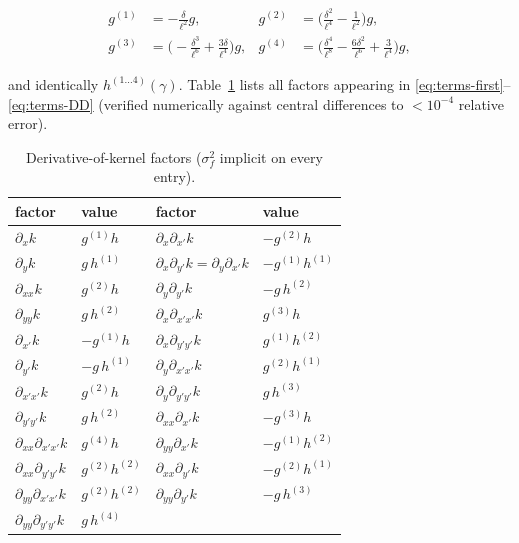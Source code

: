 \documentclass[11pt]{article}
\begin{document}
\begin{equation}
  \label{eq:gderivs}
  \begin{aligned}
  g^{(1)}&=-\tfrac{\delta}{\ell^{2}}g, &
  g^{(2)}&=\bigl(\tfrac{\delta^{2}}{\ell^{4}}-\tfrac{1}{\ell^{2}}\bigr)g, \\
  g^{(3)}&=\bigl(-\tfrac{\delta^{3}}{\ell^{6}}+\tfrac{3\delta}{\ell^{4}}\bigr)g, &
  g^{(4)}&=\bigl(\tfrac{\delta^{4}}{\ell^{8}}-\tfrac{6\delta^{2}}{\ell^{6}}+\tfrac{3}{\ell^{4}}\bigr)g,
  \end{aligned}
\end{equation}

and identically $h^{(1\ldots4)}(\gamma)$. Table~\ref{tab:factors} lists all factors
appearing in \eqref{eq:terms-first}--\eqref{eq:terms-DD} (verified numerically
against central differences to $<10^{-4}$ relative error).

\begin{table}[h]
  \centering
  \caption{Derivative-of-kernel factors ($\sigma_f^{2}$ implicit on every entry).}
  \label{tab:factors}
  \begin{tabular}{@{}llll@{}}
    \toprule
    factor & value & factor & value \\
    \midrule
    $\partial_x k$ & $g^{(1)}h$ &
    $\partial_x\partial_{x'}k$ & $-g^{(2)}h$ \\
    $\partial_y k$ & $g\,h^{(1)}$ &
    $\partial_x\partial_{y'}k=\partial_y\partial_{x'}k$ & $-g^{(1)}h^{(1)}$ \\
    $\partial_{xx}k$ & $g^{(2)}h$ &
    $\partial_y\partial_{y'}k$ & $-g\,h^{(2)}$ \\
    $\partial_{yy}k$ & $g\,h^{(2)}$ &
    $\partial_x\partial_{x'x'}k$ & $g^{(3)}h$ \\
    $\partial_{x'}k$ & $-g^{(1)}h$ &
    $\partial_x\partial_{y'y'}k$ & $g^{(1)}h^{(2)}$ \\
    $\partial_{y'}k$ & $-g\,h^{(1)}$ &
    $\partial_y\partial_{x'x'}k$ & $g^{(2)}h^{(1)}$ \\
    $\partial_{x'x'}k$ & $g^{(2)}h$ &
    $\partial_y\partial_{y'y'}k$ & $g\,h^{(3)}$ \\
    $\partial_{y'y'}k$ & $g\,h^{(2)}$ &
    $\partial_{xx}\partial_{x'}k$ & $-g^{(3)}h$ \\
    $\partial_{xx}\partial_{x'x'}k$ & $g^{(4)}h$ &
    $\partial_{yy}\partial_{x'}k$ & $-g^{(1)}h^{(2)}$ \\
    $\partial_{xx}\partial_{y'y'}k$ & $g^{(2)}h^{(2)}$ &
    $\partial_{xx}\partial_{y'}k$ & $-g^{(2)}h^{(1)}$ \\
    $\partial_{yy}\partial_{x'x'}k$ & $g^{(2)}h^{(2)}$ &
    $\partial_{yy}\partial_{y'}k$ & $-g\,h^{(3)}$ \\
    $\partial_{yy}\partial_{y'y'}k$ & $g\,h^{(4)}$ & & \\
    \bottomrule
  \end{tabular}
\end{table}
\end{document}
